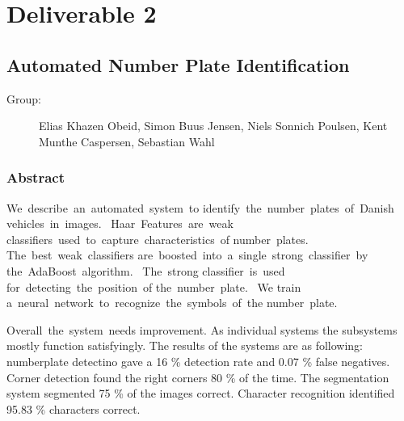 \section{Deliverable 2}

\subsection{Automated Number Plate Identification}
\begin{description}
  \item [Group:] Elias Khazen Obeid, Simon Buus Jensen, Niels Sonnich
		Poulsen, Kent Munthe Caspersen, Sebastian Wahl
\end{description}

\subsubsection{Abstract}

We describe an automated system to identify the number plates of Danish vehicles in images. 
Haar Features are weak classifiers used to capture characteristics of number plates. 
The best weak classifiers are boosted into a single strong classifier by the AdaBoost algorithm. 
The strong classifier is used \-for detecting the position of the number plate. 
We train a neural network to recognize the symbols of the number plate.

Overall the system needs improvement. 
As individual systems the subsystems mostly function satisfyingly. 
The results of the systems are as following: 
numberplate detectino gave a 16 \% detection rate and 0.07 \% false negatives.
Corner detection found the right corners 80 \% of the time. 
The segmentation system segmented 75 \% of the images correct. 
Character recognition identified 95.83 \% characters correct.
